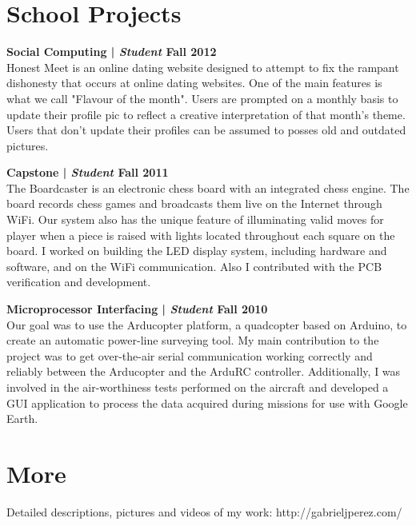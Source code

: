 \documentclass[margin,line]{res}
\begin{document}
\begin{resume}
\section{\sc School Projects}

{\bf Social Computing | {\em Student} \hfill {\bf Fall 2012 \\} }
\vspace{-.01cm}
Honest Meet is an online dating website designed to attempt to fix the rampant dishonesty that occurs at online dating websites. One of the main features is what we call "Flavour of the month". Users are prompted on a monthly basis to update their profile pic to reflect a creative interpretation of that month's theme. Users that don't update their profiles can be assumed to posses old and outdated pictures.

{\bf Capstone | {\em Student} \hfill {\bf Fall 2011 \\} }
\vspace{-.01cm}
The Boardcaster is an electronic chess board with an integrated chess engine. The board records chess games and broadcasts them live on the Internet through WiFi. Our system also has the unique feature of illuminating valid moves for player when a piece is raised with lights located throughout each square on the board. I worked on building the LED display system, including hardware and software, and on the WiFi communication. Also I contributed with the PCB verification and development.

{\bf Microprocessor Interfacing | {\em Student} \hfill {\bf Fall 2010 \\} }
\vspace{-.01cm}
Our goal was to use the Arducopter platform, a quadcopter based on Arduino, to create an automatic power-line surveying tool. My main contribution to the project was to get over-the-air serial communication working correctly and reliably between the Arducopter and the ArduRC controller. Additionally, I was involved in the air-worthiness tests performed on the aircraft and developed a GUI application to process the data acquired during missions for use with Google Earth.

\section{\sc More}
Detailed  descriptions, pictures and videos of my work: http://gabrieljperez.com/    \\

\end{resume}
\end{document}
